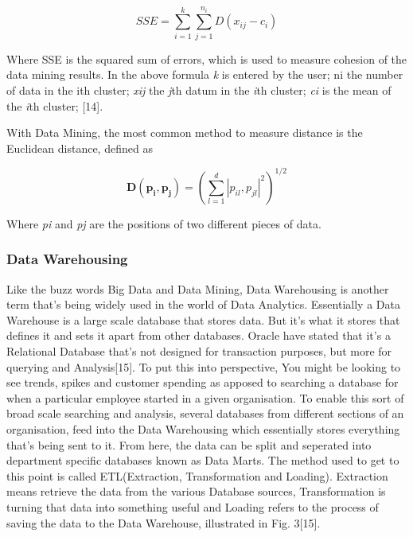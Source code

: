 \documentclass[10pt,journal,compsoc]{IEEEtran}
\begin{document}
\begin{equation}
	SSE = \sum_{i=1}^{k} \sum_{j=1}^{n_i} D( x_{ij} - c_i)
\end{equation}

Where SSE is the squared sum of errors, which is used to measure cohesion of the data mining results. In the above formula \textit{k} is entered by the user; ni the number of
data in the ith cluster; \textit{xij} the \textit{j}th datum in the \textit{i}th cluster; \textit{ci} is the mean of the \textit{i}th cluster; [14]. 

With Data Mining, the most common method to measure distance is the Euclidean distance, defined as

\begin{equation}
\mathbf{D(p_{i}, p_{j})} = 
\left(
\sum_{l=1}^{d} |p_{il}, p_{jl}|^2
\right)^{1/2}
\end{equation}

Where \textit{pi} and \textit{pj} are the positions of two different pieces of data.

\subsubsection{Data Warehousing}
Like the buzz words Big Data and Data Mining, Data Warehousing is another term that's being widely used in the world of Data Analytics. Essentially a Data Warehouse is a large scale database that stores data. But it's what it stores that defines it and sets it apart from other databases. Oracle have stated that it's a Relational Database that's not designed for transaction purposes, but more for querying and Analysis[15]. To put this into perspective, You might be looking to see trends, spikes and customer spending as apposed to searching a database for when a particular employee started in a given organisation. To enable this sort of broad scale searching and analysis, several databases from different sections of an organisation, feed into the Data Warehousing which essentially stores everything that's being sent to it. From here, the data can be split and seperated into department specific databases known as Data Marts. The method used to get to this point is called ETL(Extraction, Transformation and Loading). Extraction means retrieve the data from the various Database sources, Transformation is turning that data into something useful and Loading refers to the process of saving the data to the Data Warehouse, illustrated in Fig. 3[15].\\
\end{document}
